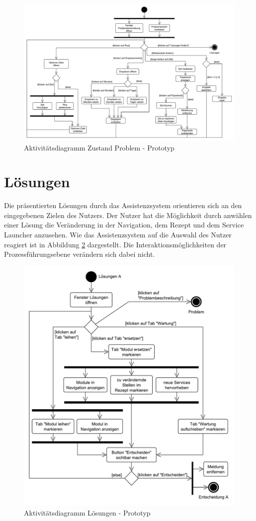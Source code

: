 \begin{figure}[tbp]
\centering
\includegraphics[angle=90,scale=0.5]{DA_files/UML/Prototyp/Aktivitaetsdiagramm-Problem.pdf}
\caption{Aktivitätsdiagramm Zustand Problem - Prototyp}
\label{pic:Aktivitaetsdiagramm-Problem}
\end{figure}

\section{Lösungen}
\label{5:Loesungen}
Die präsentierten Lösungen durch das Assistenzsystem orientieren sich an den eingegebenen Zielen des Nutzers. Der Nutzer hat die Möglichkeit durch anwählen einer Lösung die Veränderung in der Navigation, dem Rezept und dem Service Launcher anzusehen. Wie das Assistenzsystem auf die Auswahl des Nutzer reagiert ist in Abbildung \ref{pic:Aktivitaetsdiagramm-Loesungen} dargestellt. Die Interaktionsmöglichkeiten der Prozessführungsebene verändern sich dabei nicht.

\begin{figure}[htbp]
\centering
\includegraphics[scale=0.6]{DA_files/UML/Prototyp/Aktivitaetsdiagramm-Loesungen.pdf}
\caption{Aktivitätsdiagramm Lösungen - Prototyp}
\label{pic:Aktivitaetsdiagramm-Loesungen}
\end{figure}
